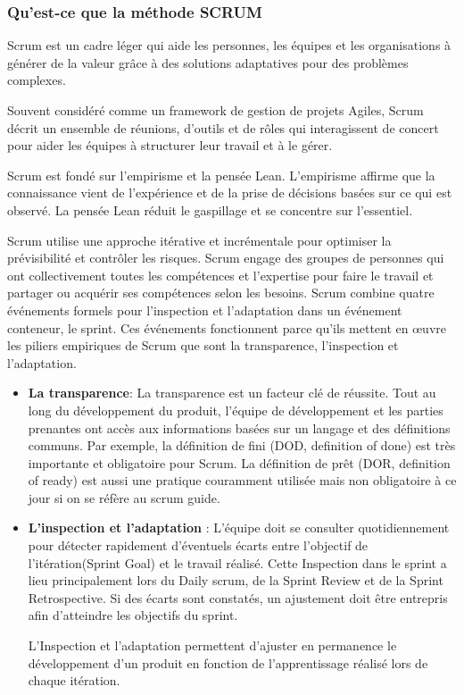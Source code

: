 \subsubsection{Qu’est-ce que la méthode SCRUM}

Scrum est un cadre léger qui aide les personnes, les équipes et les organisations à générer de la valeur grâce à
des solutions adaptatives pour des problèmes complexes\cite{schwaber2011scrum}.

Souvent considéré comme un framework de gestion de projets Agiles, Scrum décrit un ensemble de réunions, d'outils et de rôles qui interagissent de concert pour aider les équipes à structurer leur travail et à le gérer.

Scrum est fondé sur l'empirisme et la pensée Lean. L'empirisme affirme que la connaissance vient de l'expérience et de la prise de décisions basées sur ce qui est observé. La pensée Lean réduit le gaspillage et se concentre sur l'essentiel\cite{schwaber2011scrum}.

Scrum utilise une approche itérative et incrémentale pour optimiser la prévisibilité et contrôler les risques. Scrum engage des groupes de personnes qui ont collectivement toutes les compétences et l'expertise pour faire le travail et partager ou acquérir ses compétences selon les besoins. Scrum combine quatre événements formels pour l'inspection et l'adaptation dans un événement conteneur, le sprint. Ces événements fonctionnent parce qu'ils mettent en œuvre les piliers empiriques de Scrum que sont la transparence, l'inspection et l'adaptation.

\vspace{1em}
\begin{itemize}
	\setlength\itemsep{1em}
	\item \textbf{La transparence}: La transparence est un facteur clé de réussite. Tout au long du développement du produit, l’équipe de développement et les parties prenantes ont accès aux informations basées sur un langage et des définitions communs. Par exemple, la définition de fini (DOD, definition of done) est très importante et obligatoire pour Scrum. La définition de prêt (DOR, definition of ready) est aussi une pratique couramment utilisée mais non obligatoire à ce jour si on se réfère au scrum guide.
	\item \textbf{L'inspection et l'adaptation} : L’équipe doit se consulter quotidiennement pour détecter rapidement d’éventuels écarts entre l’objectif de l’itération(Sprint Goal) et le travail réalisé. Cette Inspection dans le sprint a lieu principalement lors du Daily scrum, de la Sprint Review et de la Sprint Retrospective. Si des écarts sont constatés, un ajustement doit être entrepris afin d’atteindre les objectifs du sprint.

	L’Inspection et l’adaptation permettent d’ajuster en permanence le développement d’un produit en fonction de l’apprentissage réalisé lors de chaque itération.
\end{itemize}

